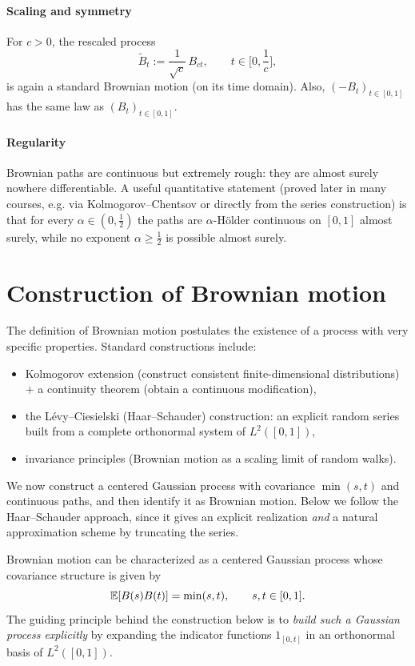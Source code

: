 \paragraph{Scaling and symmetry}
For $c>0$, the rescaled process
\[
\widetilde B_t := \frac{1}{\sqrt c}\, B_{ct},
\qquad t\in\Big[0,\frac{1}{c}\Big],
\]
is again a standard Brownian motion (on its time domain). Also, $(-B_t)_{t\in[0,1]}$
has the same law as $(B_t)_{t\in[0,1]}$.

\paragraph{Regularity}
Brownian paths are continuous but extremely rough: they are almost surely nowhere
differentiable. A useful quantitative statement (proved later in many courses, e.g.
via Kolmogorov--Chentsov or directly from the series construction) is that for every
$\alpha\in(0,\tfrac12)$ the paths are $\alpha$-H\"older continuous on $[0,1]$
almost surely, while no exponent $\alpha\ge \tfrac12$ is possible almost surely.

\section{Construction of Brownian motion}
The definition of Brownian motion postulates the existence of a process with very
specific properties. Standard constructions include:
\begin{itemize}
\item Kolmogorov extension (construct consistent finite-dimensional distributions) +
      a continuity theorem (obtain a continuous modification),
\item the L\'evy--Ciesielski (Haar--Schauder) construction: an explicit random series
      built from a complete orthonormal system of $L^2([0,1])$,
\item invariance principles (Brownian motion as a scaling limit of random walks).
\end{itemize}
We now construct a centered Gaussian process with covariance $\min(s,t)$ and continuous paths, and then identify it as Brownian motion.
Below we follow the Haar--Schauder approach, since it gives an explicit
realization \emph{and} a natural approximation scheme by truncating the series.


Brownian motion can be characterized as a centered Gaussian process whose covariance
structure is given by
\[
\mathbb{E}[B(s)B(t)] = \min(s,t), \qquad s,t \in [0,1].
\]
The guiding principle behind the construction below is to \emph{build such a Gaussian
process explicitly} by expanding the indicator functions
$1_{[0,t]}$ in an orthonormal basis of $L^2([0,1])$.

